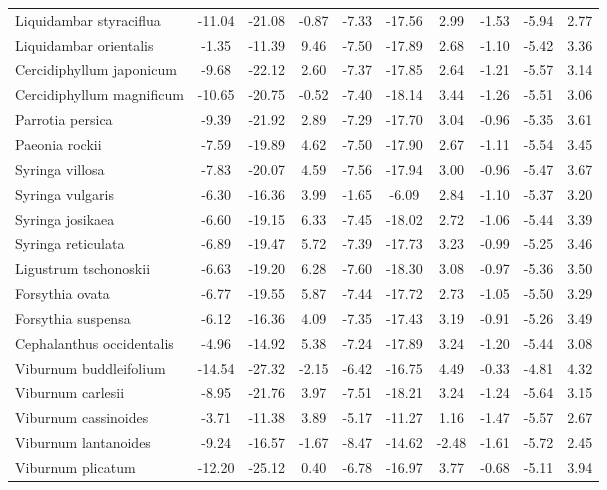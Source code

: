 \documentclass[11pt]{article}
\begin{document}
\begin{longtable}{p{1.50in}c{0.32in}c{0.32in}c{0.32in}c{0.32in}c{0.32in}c{0.32in}c{0.2in}c{0.3in}c{0.1in}}
  Liquidambar styraciflua & -11.04 & -21.08 & -0.87 & -7.33 & -17.56 & 2.99 & -1.53 & -5.94 & 2.77 \\ 
  Liquidambar orientalis & -1.35 & -11.39 & 9.46 & -7.50 & -17.89 & 2.68 & -1.10 & -5.42 & 3.36 \\ 
  Cercidiphyllum japonicum & -9.68 & -22.12 & 2.60 & -7.37 & -17.85 & 2.64 & -1.21 & -5.57 & 3.14 \\ 
  Cercidiphyllum magnificum & -10.65 & -20.75 & -0.52 & -7.40 & -18.14 & 3.44 & -1.26 & -5.51 & 3.06 \\ 
  Parrotia persica & -9.39 & -21.92 & 2.89 & -7.29 & -17.70 & 3.04 & -0.96 & -5.35 & 3.61 \\ 
  Paeonia rockii & -7.59 & -19.89 & 4.62 & -7.50 & -17.90 & 2.67 & -1.11 & -5.54 & 3.45 \\ 
  Syringa villosa & -7.83 & -20.07 & 4.59 & -7.56 & -17.94 & 3.00 & -0.96 & -5.47 & 3.67 \\ 
  Syringa vulgaris & -6.30 & -16.36 & 3.99 & -1.65 & -6.09 & 2.84 & -1.10 & -5.37 & 3.20 \\ 
  Syringa josikaea & -6.60 & -19.15 & 6.33 & -7.45 & -18.02 & 2.72 & -1.06 & -5.44 & 3.39 \\ 
  Syringa reticulata & -6.89 & -19.47 & 5.72 & -7.39 & -17.73 & 3.23 & -0.99 & -5.25 & 3.46 \\ 
  Ligustrum tschonoskii & -6.63 & -19.20 & 6.28 & -7.60 & -18.30 & 3.08 & -0.97 & -5.36 & 3.50 \\ 
  Forsythia ovata & -6.77 & -19.55 & 5.87 & -7.44 & -17.72 & 2.73 & -1.05 & -5.50 & 3.29 \\ 
  Forsythia suspensa & -6.12 & -16.36 & 4.09 & -7.35 & -17.43 & 3.19 & -0.91 & -5.26 & 3.49 \\ 
  Cephalanthus occidentalis & -4.96 & -14.92 & 5.38 & -7.24 & -17.89 & 3.24 & -1.20 & -5.44 & 3.08 \\ 
  Viburnum buddleifolium & -14.54 & -27.32 & -2.15 & -6.42 & -16.75 & 4.49 & -0.33 & -4.81 & 4.32 \\ 
  Viburnum carlesii & -8.95 & -21.76 & 3.97 & -7.51 & -18.21 & 3.24 & -1.24 & -5.64 & 3.15 \\ 
  Viburnum cassinoides & -3.71 & -11.38 & 3.89 & -5.17 & -11.27 & 1.16 & -1.47 & -5.57 & 2.67 \\ 
  Viburnum lantanoides & -9.24 & -16.57 & -1.67 & -8.47 & -14.62 & -2.48 & -1.61 & -5.72 & 2.45 \\ 
  Viburnum plicatum & -12.20 & -25.12 & 0.40 & -6.78 & -16.97 & 3.77 & -0.68 & -5.11 & 3.94 \\ 

\end{longtable}
\end{document}
